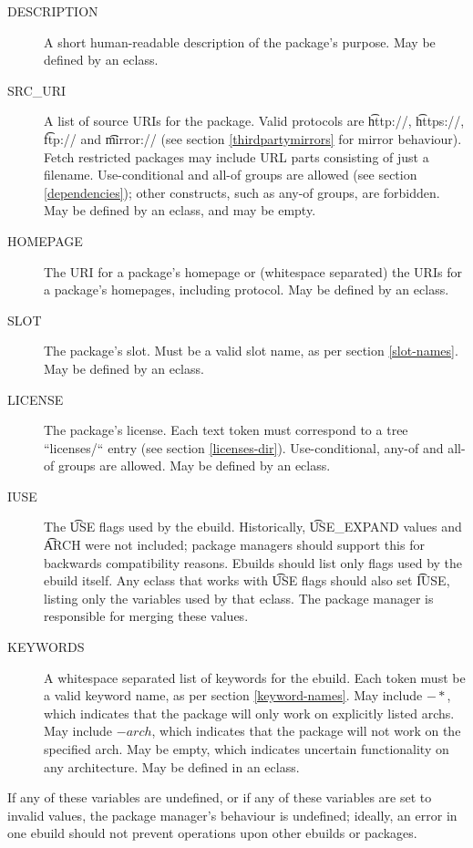 \begin{description}
\item[DESCRIPTION] A short human-readable description of the package's purpose. May be defined by an
    eclass.
\item[SRC\_URI] A list of source URIs for the package. Valid protocols are \t{http://},
    \t{https://}, \t{ftp://} and \t{mirror://} (see section \ref{thirdpartymirrors} for mirror behaviour).
    Fetch restricted packages may include URL parts consisting of just a filename.  Use-conditional and
    all-of groups are allowed (see section \ref{dependencies}); other constructs,
    such as any-of groups, are forbidden. May be defined by an eclass, and may be empty.
\item[HOMEPAGE] The URI for a package's homepage or (whitespace separated) the URIs for a package's
    homepages, including protocol. May be defined by an eclass.
\item[SLOT] The package's slot. Must be a valid slot name, as per section \ref{slot-names}. May
    be defined by an eclass.
\item[LICENSE] The package's license. Each text token must correspond to a tree ``licenses/`` entry
    (see section \ref{licenses-dir}). Use-conditional, any-of and all-of groups are allowed.
    May be defined by an eclass. \label{ebuild-var-LICENSE}
\item[IUSE] The \t{USE} flags used by the ebuild. Historically, \t{USE\_EXPAND} values and \t{ARCH}
    were not included; package managers should support this for backwards compatibility reasons. Ebuilds
    should list only flags used by the ebuild itself. Any eclass that works with \t{USE} flags
    should also set \t{IUSE}, listing only the variables used by that eclass. The package manager is
    responsible for merging these values.
\item[KEYWORDS] A whitespace separated list of keywords for the ebuild. Each token must be a
    valid keyword name, as per section \ref{keyword-names}. May include $-*$, which
    indicates that the package will only work on explicitly listed archs. May include $-arch$,
    which indicates that the package will not work on the specified arch. May be empty, which
    indicates uncertain functionality on any architecture. May be defined in an eclass.
\end{description}

If any of these variables are undefined, or if any of these variables are set to invalid values,
the package manager's behaviour is undefined; ideally, an error in one ebuild should not prevent
operations upon other ebuilds or packages.

